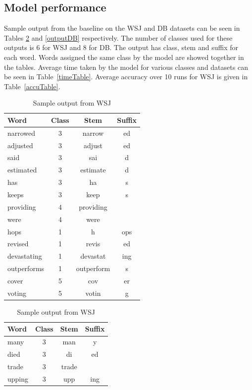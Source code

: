 \documentclass{article}
\begin{document}
\subsection{Model performance}

Sample output from the baseline on the WSJ and DB datasets can be seen 
in Tables \ref{outputWSJ} and \ref{outputDB} respectively. The number 
of classes used for these outputs is 6 for WSJ and 8 for DB. The output
 has class, stem and suffix for each word. Words assigned the same class
 by the model are showed together in the tables. Average time taken by 
the model for various classes and datasets can be seen in 
Table~\ref{timeTable}. Average accuracy over 10 runs for WSJ is given 
in Table~\ref{accuTable}.


\begin{table}[ht]
\begin{minipage}[b]{0.5\linewidth}\centering
\begin{tabular}{lccc}
\hline
Word & Class & Stem & Suffix \\
\hline
narrowed&3&narrow&ed \\
adjusted&3&adjust&ed \\
said&3&sai&d \\
estimated&3&estimate&d \\
has&3&ha&s \\
keeps&3&keep&s \\
providing & 4 & providing & \\
were&4&were& \\
hops&1&h&ops \\ 
revised&1&revis&ed \\
devastating&1&devastat&ing\\
outperforms&1&outperform&s\\
cover&5&cov&er \\
voting&5&votin&g \\
\hline
 \end{tabular}
\caption{\label{outputWSJ} Sample output from WSJ}
\end{minipage}
\begin{minipage}[b]{0.5\linewidth}\centering
\begin{tabular}{lccc}
\hline
  Word & Class & Stem & Suffix \\
\hline
many & 3 & man & y \\
died & 3 & di & ed \\
trade & 3 & trade &  \\
upping & 3 & upp & ing \\

\end{tabular}
\end{minipage}
\end{table}
\end{document}
